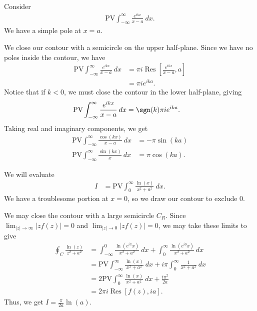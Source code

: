 \documentclass[10pt]{mypackage}
\DeclareMathOperator{\res}{Res}
\begin{document}
   \begin{example}
     Consider
     \begin{align*}
       \text{PV}\int_{-\infty}^{\infty} \frac{e^{ikx}}{x-a}\:dx.
     \end{align*}
     We have a simple pole at $x = a$.\newline

     We close our contour with a semicircle on the upper half-plane. Since we have no poles inside the contour, we have
     \begin{align*}
       \text{PV}\int_{-\infty}^{\infty} \frac{e^{ikx}}{x-a}\:dx &= \pi i \res\left[ \frac{e^{ikx}}{x-a},a \right]\\
                                                                &= \pi i e^{ika}.
     \end{align*}
     Notice that if $k < 0$, we must close the contour in the lower half-plane, giving
     \begin{align*}
       \text{PV}\int_{-\infty}^{\infty} \frac{e^{ikx}}{x-a}\:dx &= \sgn(k)\pi i e^{ika}.
     \end{align*}
     Taking real and imaginary components, we get
     \begin{align*}
       \text{PV}\int_{-\infty}^{\infty} \frac{\cos\left( kx \right)}{x-a}\:dx &= -\pi\sin\left( ka \right)\\
       \text{PV}\int_{-\infty}^{\infty} \frac{\sin\left( kx \right)}{x}\:dx &= \pi\cos\left( ka \right).
     \end{align*}
   \end{example}
   \begin{example}
     We will evaluate
     \begin{align*}
       I &= \text{PV}\int_{0}^{\infty} \frac{\ln(x)}{x^2 + a^2}\:dx.
     \end{align*}
     We have a troublesome portion at $x = 0$, so we draw our contour to exclude $0$.\newline

     We may close the contour with a large semicircle $C_R$. Since $\lim_{|z|\rightarrow \infty}\left\vert zf(z) \right\vert = 0$ and $\lim_{|z|\rightarrow 0}\left\vert zf(z) \right\vert = 0$, we may take these limits to give
     \begin{align*}
       \oint_{C}\frac{\ln(z)}{z^2 + a^2} &= \int_{-\infty}^{0} \frac{\ln\left( e^{i\pi}x \right)}{x^2 + a^2}\:dx + \int_{0}^{\infty} \frac{\ln\left(e^{i0}x\right)}{x^2 + a^2}\:dx\\
                                         &= \text{PV}\int_{-\infty}^{\infty} \frac{\ln(x)}{x^2 + a^2}\:dx + i\pi \int_{0}^{\infty} \frac{1}{x^2 + a^2}\:dx\\
                                         &= 2\text{PV}\int_{0}^{\infty} \frac{\ln(x)}{x^2 + a^2}\:dx + \frac{i\pi^2}{2a}\\
                                         &= 2\pi i \res\left[ f(z),ia \right].
     \end{align*}
     Thus, we get $I = \frac{\pi}{2a}\ln(a)$.
   \end{example}
\end{document}
